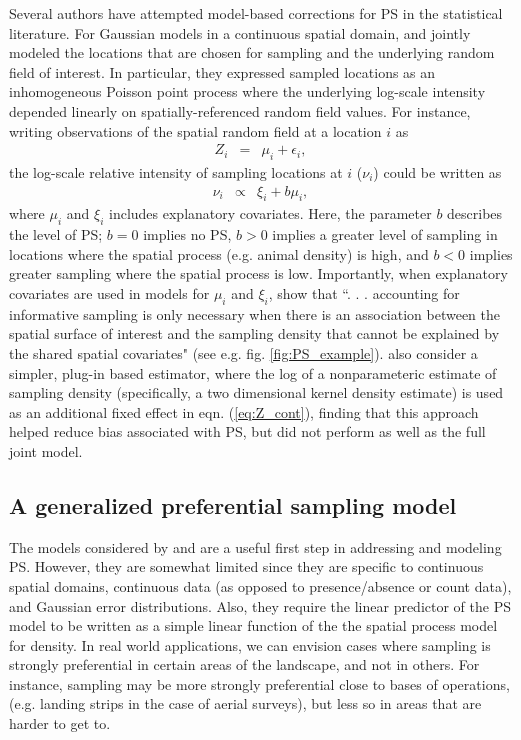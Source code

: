 \documentclass[times,mee,doublespace,]{besauth2}
\begin{document}
Several authors have attempted model-based corrections for PS in the statistical literature. For Gaussian models in a continuous spatial domain, \citet{DiggleEtAl2010} and \citet{PatiEtAl2011} jointly modeled the locations that are chosen for sampling and the underlying random field of interest.  In particular, they expressed sampled locations as an inhomogeneous Poisson point process where the underlying log-scale intensity depended linearly on spatially-referenced random field values.  For instance, writing observations of the spatial random field at a location $i$ as
\begin{eqnarray}
   Z_i & = & \mu_i + \epsilon_i,
   \label{eq:Z_cont}
\end{eqnarray}
the log-scale relative intensity of sampling locations at $i$ ($\nu_i$) could be written as
\begin{eqnarray}
   \nu_i & \propto & \xi_i + b \mu_i,
   \label{eq:p_cont}
\end{eqnarray}
where $\mu_i$ and $\xi_i$ includes explanatory covariates.
Here, the parameter $b$ describes the level of PS; $b=0$ implies no PS, $b>0$ implies a greater level of sampling in locations where the spatial process (e.g. animal density) is high, and $b<0$ implies greater sampling where the spatial process is low.  Importantly, when explanatory covariates are used in models for $\mu_i$ and $\xi_i$, \citet{PatiEtAl2011} show that ``. . . accounting for informative sampling is only necessary when there
is an association between the spatial surface of interest and the sampling density that cannot be
explained by the shared spatial covariates" (see e.g. fig. \ref{fig:PS_example}).    \citet{PatiEtAl2011} also consider a simpler, plug-in based estimator, where the log of a nonparameteric estimate of sampling density (specifically, a two dimensional kernel density estimate) is used as an additional fixed effect in eqn. (\ref{eq:Z_cont}), finding that this approach helped reduce bias associated with PS, but did not perform as well as the full joint model.

\subsection{A generalized preferential sampling model}

The models considered by \citet{DiggleEtAl2010} and \citet{PatiEtAl2011} are a useful first step in addressing and modeling PS.  However, they are somewhat limited since they are specific to continuous spatial domains, continuous data (as opposed to presence/absence or count data), and Gaussian error distributions.  Also, they require the linear predictor of the PS model to be written as a simple linear function of the the spatial process model for density.  In real world applications, we can envision cases where sampling is strongly preferential in certain areas of the landscape, and not in others.  For instance, sampling may be more strongly preferential close to bases of operations, (e.g. landing strips in the case of aerial surveys), but less so in areas that are harder to get to.
\end{document}
